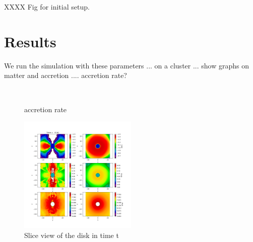 \documentclass[a4paper,fleqn,usenatbib,useAMS]{mnras}
\begin{document}
XXXX Fig for initial setup.

\section{Results}
\label{sec:results}
We run the simulation with these parameters ... 
on a cluster  ...
show graphs on matter and accretion ....
accretion rate?
\begin{figure}
    \begin{center}
         \\
    \end{center}
    \caption{
        accretion rate
        }
    \label{fig:accretion_rate}
\end{figure}

\begin{figure}
    \begin{center}
        \includegraphics[width=0.5\textwidth]{disk_hdf5_chk_0005_slice.png}
    \end{center}
    \caption{
        Slice view of the disk in time t
        }
    \label{fig:disk_chk_slice}
\end{figure}
\end{document}
